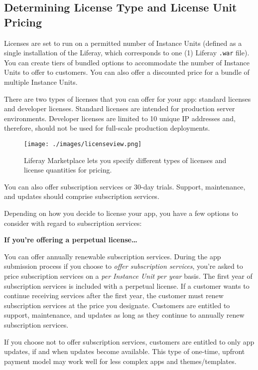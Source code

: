 \subsection{Determining License Type and License Unit
Pricing}\label{determining-license-type-and-license-unit-pricing}

Licenses are set to run on a permitted number of Instance Units (defined
as a single installation of the Liferay, which corresponds to one (1)
Liferay \texttt{.war} file). You can create tiers of bundled options to
accommodate the number of Instance Units to offer to customers. You can
also offer a discounted price for a bundle of multiple Instance Units.

There are two types of licenses that you can offer for your app:
standard licenses and developer licenses. Standard licenses are intended
for production server environments. Developer licenses are limited to 10
unique IP addresses and, therefore, should not be used for full-scale
production deployments.

\begin{figure}
\centering
\texttt{[image: ./images/licenseview.png]}
\caption{Liferay Marketplace lets you specify different types of
licenses and license quantities for pricing.}
\end{figure}

You can also offer subscription services or 30-day trials. Support,
maintenance, and updates should comprise subscription services.

Depending on how you decide to license your app, you have a few options
to consider with regard to subscription services:

\textbf{If you're offering a perpetual license\ldots{}}

You can offer annually renewable subscription services. During the app
submission process if you choose to \emph{offer subscription services},
you're asked to price subscription services on a \emph{per Instance Unit
per year} basis. The first year of subscription services is included
with a perpetual license. If a customer wants to continue receiving
services after the first year, the customer must renew subscription
services at the price you designate. Customers are entitled to support,
maintenance, and updates as long as they continue to annually renew
subscription services.

If you choose not to offer subscription services, customers are entitled
to only app updates, if and when updates become available. This type of
one-time, upfront payment model may work well for less complex apps and
themes/templates.

